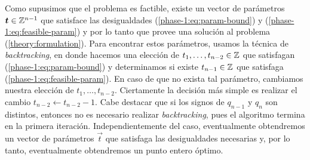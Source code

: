 Como supusimos que el problema es factible, existe un vector de parámetros $\boldsymbol{t} \in \mathbb{Z}^{n-1}$
que satisface las desigualdades (\ref{phase-1:eq:param-bound}) y (\ref{phase-1:eq:feasible-param}) y
por lo tanto que provee una solución al problema (\ref{theory:formulation}). Para encontrar estos
parámetros, usamos la técnica de \textit{backtracking}, en donde hacemos una elección de $t_1,
\ldots, t_{n-2} \in \mathbb{Z}$ que satisfagan (\ref{phase-1:eq:param-bound}) y determinamos si existe
$t_{n-1} \in \mathbb{Z}$ que satisfaga (\ref{phase-1:eq:feasible-param}). En caso de que no exista tal
parámetro, cambiamos nuestra elección de $t_1, \ldots, t_{n-2}$. Ciertamente la decisión más simple
es realizar el cambio $t_{n-2} \leftarrow t_{n-2} - 1$. Cabe destacar que si los signos de $q_{n-1}$
y $q_n$ son distintos, entonces no es necesario realizar \textit{backtracking}, pues el algoritmo
termina en la primera iteración. Independientemente del caso, eventualmente obtendremos un vector de
parámetros $\vec{t}$ que satisfaga las desigualdades necesarias y, por lo tanto, eventualmente
obtendremos un punto entero óptimo.
